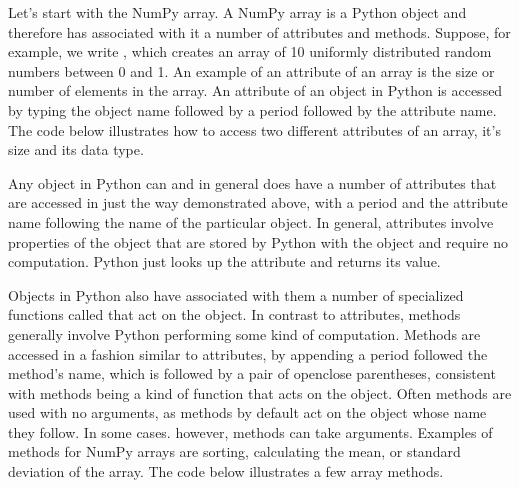 \documentclass[letterpaper,10pt,english]{sphinxmanual}
\begin{document}
\sphinxAtStartPar
Let’s start with the NumPy array.  A NumPy array is a Python object and therefore has associated with it a number of attributes and methods. Suppose, for example, we write , which creates an array of 10 uniformly distributed random numbers between 0 and 1.  An example of an attribute of an array is the size or number of elements in the array.  An attribute of an object in Python is accessed by typing the object name followed by a period followed by the attribute name.  The code below illustrates how to access two different attributes of an array, it’s size and its data type.

\begin{sphinxVerbatim}[commandchars=\\\{\},numbers=left,firstnumber=1,stepnumber=1]
  


\end{sphinxVerbatim}

\sphinxAtStartPar
Any object in Python can and in general does have a number of attributes that are accessed in just the way demonstrated above, with a period and the attribute name following the name of the particular object.  In general, attributes involve properties of the object that are stored by Python with the object and require no computation.   Python just looks up the attribute and returns its value.

\sphinxAtStartPar
Objects in Python also have associated with them a number of specialized functions called  that act on the object.  In contrast to attributes, methods generally involve Python performing some kind of computation.  Methods are accessed in a fashion similar to attributes, by appending a period followed the method’s name, which is followed by a pair of open\sphinxhyphen{}close parentheses, consistent with methods being a kind of function that acts on the object.  Often methods are used with no arguments, as methods by default act on the object whose name they follow.  In some cases. however, methods can take arguments.  Examples of methods for NumPy arrays are sorting, calculating the mean, or standard deviation of the array.  The code below illustrates a few array methods.
\end{document}
